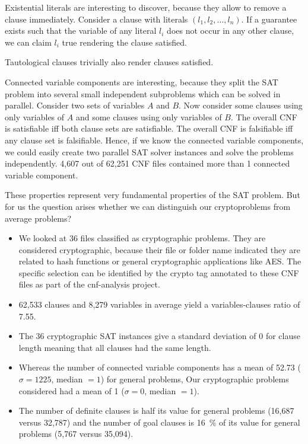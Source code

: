 Existential literals are interesting to discover, because they allow
to remove a clause immediately. Consider a clause with literals
$(l_1, l_2, \ldots, l_n)$. If a guarantee exists such that the variable
of any literal $l_i$ does not occur in any other clause, we can claim
$l_i$ true rendering the clause satisfied.

Tautological clauses trivially also render clauses satisfied.

Connected variable components are interesting, because they split the
SAT problem into several small independent subproblems which can be 
solved in parallel.
Consider two sets of variables $A$ and $B$. Now consider some clauses
using only variables of $A$ and some clauses using only variables of $B$.
The overall CNF is satisfiable iff both clause sets are satisfiable.
The overall CNF is falsifiable iff any clause set is falsifiable.
Hence, if we know the connected variable components, we could easily
create two parallel SAT solver instances and solve the problems
independently. 4,607 out of 62,251 CNF files contained more than 1
connected variable component.

These properties represent very fundamental properties of the SAT problem.
But for us the question arises whether we can distinguish our cryptoproblems
from average problems?

\begin{itemize}
\item We looked at 36 files classified as cryptographic problems.
  They are considered cryptographic, because their file or folder name
  indicated they are related to hash functions or general cryptographic
  applications like AES. The specific selection can be identified by
  the crypto tag annotated to these CNF files as part of the cnf-analysis
  project.
\item 62,533 clauses and 8,279 variables in average yield a variables-clauses
  ratio of 7.55.
\item The 36 cryptographic SAT instances give a standard deviation of 0
  for clause length meaning that all clauses had the same length.
\item Whereas the number of connected variable components has a mean
  of 52.73 ($\sigma = 1225$, median $= 1$) for general problems,
  Our cryptographic problems considered had a mean of 1 ($\sigma = 0$, median $= 1$).
\item The number of definite clauses is half its value for general problems
  (16,687 versus 32,787) and the number of goal clauses is 16~\% of its
  value for general problems (5,767 versus 35,094).
\end{itemize}

